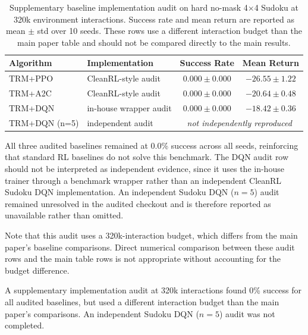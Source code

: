 \begin{table}[h]
\centering
\caption{Supplementary baseline implementation audit on hard no-mask
4$\times$4 Sudoku at 320k environment interactions. Success rate and mean
return are reported as mean $\pm$ std over 10 seeds. These rows use a
different interaction budget than the main paper table and should not be
compared directly to the main results.}
\begin{tabular}{llcc}
\toprule
Algorithm & Implementation & Success Rate & Mean Return \\
\midrule
TRM+PPO & CleanRL-style audit & $0.000 \pm 0.000$ & $-26.55 \pm 1.22$ \\
TRM+A2C & CleanRL-style audit & $0.000 \pm 0.000$ & $-20.64 \pm 0.48$ \\
TRM+DQN & in-house wrapper audit & $0.000 \pm 0.000$ & $-18.42 \pm 0.36$ \\
TRM+DQN (n=5) & independent audit & \multicolumn{2}{c}{\textit{not independently reproduced}} \\
\bottomrule
\end{tabular}
\end{table}

All three audited baselines remained at 0.0\% success across all seeds,
reinforcing that standard RL baselines do not solve this benchmark.
The DQN audit row should not be interpreted as independent evidence,
since it uses the in-house trainer through a benchmark wrapper rather
than an independent CleanRL Sudoku DQN implementation. An independent
Sudoku DQN ($n{=}5$) audit remained unresolved in the audited checkout
and is therefore reported as unavailable rather than omitted.

Note that this audit uses a 320k-interaction budget, which differs from
the main paper's baseline comparisons. Direct numerical comparison
between these audit rows and the main table rows is not appropriate
without accounting for the budget difference.

A supplementary implementation audit at 320k interactions found 0\%
success for all audited baselines, but used a different interaction
budget than the main paper's comparisons. An independent Sudoku DQN
($n{=}5$) audit was not completed.
